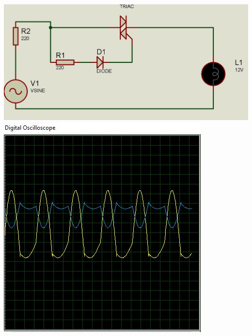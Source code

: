 \documentclass[12pt,a4paper]{article}
\begin{document}
\begin{center}
\includegraphics[scale=0.4]{imagenes/tiristorCA.JPG} 
\linebreak
\linebreak
\includegraphics[scale=0.8]{imagenes/tiristorCA1.JPG}
\end{center}
\end{document}
